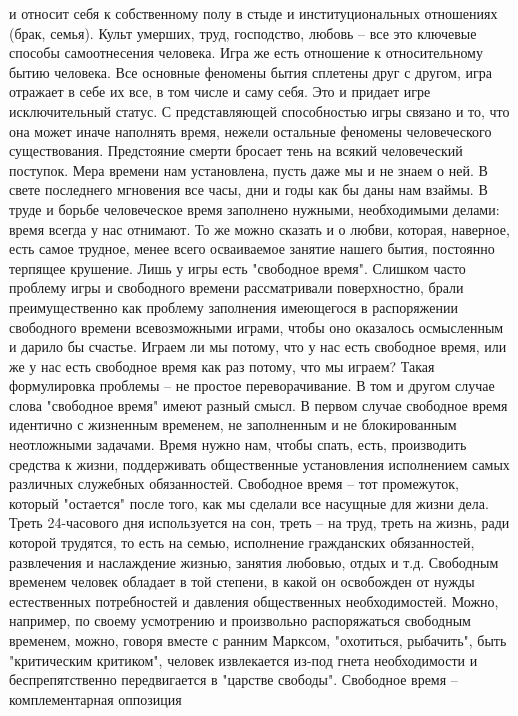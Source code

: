 \documentclass[12pt]{article}
\begin{document}
и относит себя к собственному полу в стыде и институциональных отношениях (брак, семья). Культ умерших,
труд, господство, любовь -- все это ключевые способы самоотнесения человека. Игра же есть отношение к
относительному бытию человека. Все основные феномены бытия сплетены друг с другом, игра отражает в себе
их все, в том числе и саму себя. Это и придает игре исключительный статус. С представляющей способностью
игры  связано  и  то,  что  она  может  иначе  наполнять  время,  нежели  остальные  феномены  человеческого
существования.  Предстояние  смерти  бросает  тень  на  всякий  человеческий  поступок.  Мера  времени  нам
установлена, пусть даже мы и не знаем о ней. В свете последнего мгновения все часы, дни и годы как бы даны
нам взаймы. В труде и борьбе человеческое время заполнено нужными, необходимыми делами: время всегда у
нас отнимают. То же можно сказать и о любви, которая, наверное, есть самое трудное, менее всего осваиваемое
занятие нашего бытия, постоянно терпящее крушение.
Лишь у игры есть "свободное время". Слишком часто проблему игры и свободного времени рассматривали
поверхностно,  брали  преимущественно  как  проблему  заполнения  имеющегося  в  распоряжении  свободного
времени всевозможными играми, чтобы  оно  оказалось  осмысленным  и  дарило бы  счастье.  Играем ли мы
потому, что у нас есть свободное время, или же у нас есть свободное время как раз потому, что мы играем?
Такая формулировка проблемы -- не простое переворачивание. В том и другом случае слова "свободное время"
имеют разный смысл. В первом случае свободное время идентично с жизненным временем, не заполненным и
не блокированным неотложными задачами. Время нужно нам, чтобы спать, есть, производить средства к жизни,
поддерживать  общественные  установления  исполнением  самых  различных  служебных  обязанностей.
Свободное время -- тот промежуток, который "остается" после того, как мы сделали все насущные для жизни
дела. Треть 24-часового дня используется на сон, треть -- на труд, треть на жизнь, ради которой трудятся, то
есть на семью, исполнение гражданских обязанностей, развлечения и наслаждение жизнью, занятия любовью,
отдых  и  т.д.  Свободным  временем  человек  обладает  в  той  степени,  в  какой  он  освобожден  от  нужды
естественных  потребностей  и  давления  общественных  необходимостей.  Можно,  например,  по  своему 
усмотрению и произвольно распоряжаться свободным временем, можно, говоря вместе с ранним Марксом,
"охотиться,  рыбачить",  быть  "критическим  критиком",  человек  извлекается  из-под  гнета  необходимости  и
беспрепятственно  передвигается  в  "царстве  свободы".  Свободное  время  --  комплементарная  оппозиция
\end{document}
